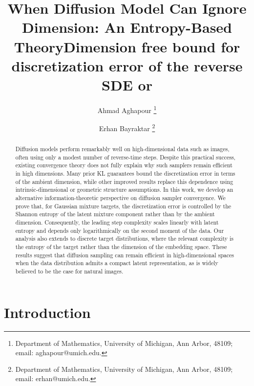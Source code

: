 \documentclass[11pt]{article}
\title{When Diffusion Model Can Ignore Dimension: An Entropy-Based Theory}
\title{Dimension free bound for discretization error of the reverse SDE or \blue{Sampling error of Diffusion model depends on target distribution entropy }}
\author{
  Ahmad Aghapour \thanks{Department of Mathematics, University of Michigan, Ann Arbor, 48109; email: aghapour@umich.edu. }
  \and
  Erhan Bayraktar \thanks{Department of Mathematics, University of Michigan, Ann Arbor, 48109; email: erhan@umich.edu. }
}
\date{}
\begin{document}
\maketitle

\begin{abstract}
Diffusion models perform remarkably well on high-dimensional data such as images, often using only a modest number of reverse-time steps. Despite this practical success, existing convergence theory does not fully explain why such samplers remain efficient in high dimensions. Many prior KL guarantees bound the discretization error in terms of the ambient dimension, while other improved results replace this dependence using intrinsic-dimensional or geometric structure assumptions. In this work, we develop an alternative information-theoretic perspective on diffusion sampler convergence. We prove that, for Gaussian mixture targets, the discretization error is controlled by the Shannon entropy of the latent mixture component rather than by the ambient dimension. Consequently, the leading step complexity scales linearly with latent entropy and depends only logarithmically on the second moment of the data. Our analysis also extends to discrete target distributions, where the relevant complexity is the entropy of the target rather than the dimension of the embedding space. These results suggest that diffusion sampling can remain efficient in high-dimensional spaces when the data distribution admits a compact latent representation, as is widely believed to be the case for natural images.
\end{abstract}

\section{Introduction}
\end{document}
